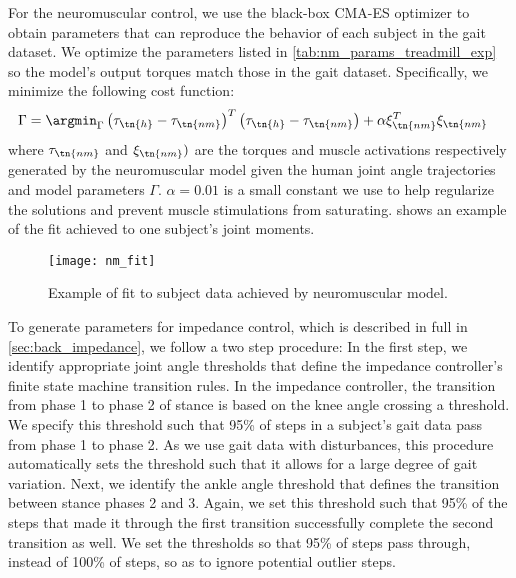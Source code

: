 For the neuromuscular control, we use the black-box CMA-ES optimizer
\citep{hansen2006cma} to obtain parameters that can reproduce the behavior of
each subject in the gait dataset. We optimize the parameters listed in
\cref{tab:nm_params_treadmill_exp} so the model's output torques match those in
the gait dataset. Specifically, we minimize the following cost function:
\begin{align}
    \Gamma &= \argmin_\Gamma \left(\tau_\tn{h} - \tau_\tn{nm} \right)^T
    \left(\tau_\tn{h} - \tau_\tn{nm} \right) + \alpha \xi_\tn{nm}^T \xi_\tn{nm}
\end{align}
where $\tau_\tn{nm}$ and  $\xi_\tn{nm})$ are the torques and muscle activations
respectively generated by the neuromuscular model given the human joint angle
trajectories and model parameters $\Gamma$. $\alpha = 0.01$ is a small constant
we use to help regularize the solutions and prevent muscle stimulations from
saturating.   shows an example of the fit achieved to
one subject's joint moments.
\begin{figure}[t]
    \centering 
    \texttt{[image: nm\_fit]}
    \caption{Example of fit to subject data achieved by neuromuscular
    model.}\label{fig:treadmill_nm_fit}
\end{figure}

To generate parameters for impedance control, which is described in full in
\cref{sec:back_impedance}, we follow a two step procedure: In the first step, we
identify appropriate joint angle thresholds that define the impedance
controller's finite state machine transition rules. In the impedance controller,
the transition from phase 1 to phase 2 of stance is based on the knee angle
crossing a threshold. We specify this threshold such that 95\% of steps in a
subject's gait data pass from phase 1 to phase 2. As we use gait data with
disturbances, this procedure automatically sets the threshold such that it
allows for a large degree of gait variation. Next, we identify the ankle angle
threshold that defines the transition between stance phases 2 and 3. Again, we
set this threshold such that 95\% of the steps that made it through the first
transition successfully complete the second transition as well. We set the
thresholds so that 95\% of steps pass through, instead of 100\% of steps, so as
to ignore potential outlier steps.

